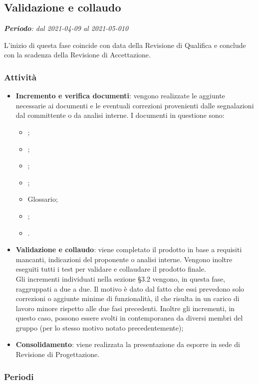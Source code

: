 \subsection{Validazione e collaudo}
\textit{\textbf{Periodo}: dal 2021-04-09 al 2021-05-010}

L'inizio di questa fase coincide con data della Revisione di Qualifica e conclude con la scadenza della Revisione di Accettazione.

\subsubsection{Attività}

\begin{itemize}
\item \textbf{Incremento e verifica documenti}: vengono realizzate le aggiunte necessarie ai documenti e le eventuali correzioni provenienti dalle segnalazioni dal committente o da analisi interne. I documenti in questione sono:
\begin{itemize}
\item \NdP{};
\item \AdR{};
\item \PdQ{};
\item \PdP{};
\item Glossario;
\item \MU{};
\item \MM{}.
\end{itemize}
\item \textbf{Validazione e collaudo}: viene completato il prodotto in base a requisiti mancanti, indicazioni del proponente o analisi interne. Vengono inoltre eseguiti tutti i test per validare e collaudare il prodotto finale.\\ Gli incrementi individuati nella sezione \S{3.2} vengono, in questa fase, raggruppati a due a due. Il motivo è dato dal fatto che essi prevedono solo correzioni o aggiunte minime di funzionalità, il che risulta in un carico di lavoro minore rispetto alle due fasi precedenti. Inoltre gli incrementi, in questo caso, possono essere svolti in contemporanea da diversi membri del gruppo (per lo stesso motivo notato precedentemente);
\item \textbf{Consolidamento}: viene realizzata la presentazione da esporre in sede di Revisione di Progettazione.
\end{itemize}

\subsubsection{Periodi}

